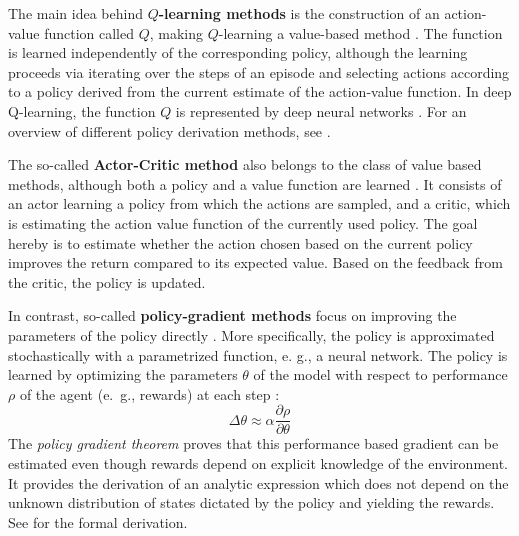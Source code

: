 The main idea behind \textbf{$Q$-learning methods} is the construction of an action-value function called $Q$, making $Q$-learning a value-based method \parencite{sutton2018reinforcement}. The function is learned independently of the corresponding policy, although the learning proceeds via iterating over the steps of an episode and selecting actions according to a policy derived from the current estimate of the action-value function. In deep Q-learning, the function $Q$ is represented by deep neural networks \parencite[e.g.,][]{hester2018deep}. For an overview of different policy derivation methods, see \cite{sutton2018reinforcement}. 

The so-called \textbf{Actor-Critic method} also belongs to the class of value based methods, although both a policy and a value function are learned \parencite{sutton2018reinforcement}. It consists of an actor learning a policy from which the actions are sampled, and a critic, which is estimating the action value function of the currently used policy. The goal hereby is to estimate whether the action chosen based on the current policy improves the return compared to its expected value. Based on the feedback from the critic, the policy is updated. 

In contrast, so-called \textbf{policy-gradient methods} focus on improving the parameters of the policy directly \parencite{sutton2018reinforcement, sutton1999policy, williams1992simple}. %
More specifically, the policy is approximated stochastically with a parametrized function, e. g., a neural network. The policy is learned by optimizing the parameters $\theta$ of the model with respect to performance $\rho$ of the agent (e.~g., rewards) at each step \parencite[][p. 1058]{sutton1999policy}: 
\begin{equation}
\Delta \theta \approx \alpha \frac{\partial \rho}{\partial \theta} 
\end{equation}
The \textit{policy gradient theorem} proves that this performance based gradient can be estimated even though rewards depend on explicit knowledge of the environment. It provides the derivation of an analytic expression which does not depend on the unknown distribution of states dictated by the policy and yielding the rewards. See \cite[][p. 326f.,]{sutton2018reinforcement} for the formal derivation.

